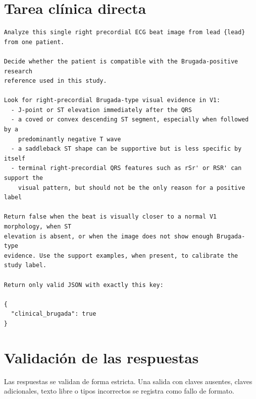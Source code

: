 \section{Tarea cl\'inica directa}

\begin{lstlisting}
Analyze this single right precordial ECG beat image from lead {lead} from one patient.

Decide whether the patient is compatible with the Brugada-positive research
reference used in this study.

Look for right-precordial Brugada-type visual evidence in V1:
  - J-point or ST elevation immediately after the QRS
  - a coved or convex descending ST segment, especially when followed by a
    predominantly negative T wave
  - a saddleback ST shape can be supportive but is less specific by itself
  - terminal right-precordial QRS features such as rSr' or RSR' can support the
    visual pattern, but should not be the only reason for a positive label

Return false when the beat is visually closer to a normal V1 morphology, when ST
elevation is absent, or when the image does not show enough Brugada-type
evidence. Use the support examples, when present, to calibrate the study label.

Return only valid JSON with exactly this key:

{
  "clinical_brugada": true
}
\end{lstlisting}

\section{Validaci\'on de las respuestas}

Las respuestas se validan de forma estricta. Una salida con claves ausentes, claves adicionales, texto libre o tipos incorrectos se registra como fallo de formato.
